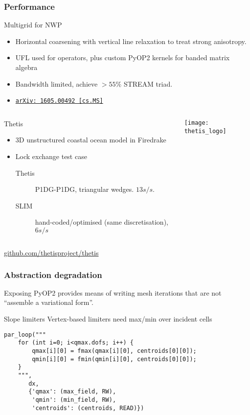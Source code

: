 \documentclass[presentation]{beamer}
\newcommand{\arxivlink}[2]{%
  \href{http://www.arxiv.org/abs/#1}%
  {{\small\texttt{arXiv:\,#1\,[#2]}}}%
}
\begin{document}
\begin{frame}[allowframebreaks]
  \frametitle{Performance}

  \begin{block}{Multigrid for NWP}
    \begin{itemize}
    \item Horizontal coarsening with vertical line relaxation to treat
      strong anisotropy.
    \item UFL used for operators, plus custom PyOP2 kernels for banded
      matrix algebra
    \item Bandwidth limited, achieve $> 55\%$ STREAM triad.
    \item \cite{Mitchell:2016} \arxivlink{1605.00492}{cs.MS}
    \end{itemize}
  \end{block}

\pagebreak

  \begin{columns}
    \begin{column}{0.7\textwidth}
      \begin{block}{Thetis}
        \begin{itemize}
        \item 3D unstructured coastal ocean model in Firedrake
        \item Lock exchange test case
          \begin{description}
          \item[Thetis] P1DG-P1DG, triangular wedges.  $13s/s$.
          \item[SLIM] hand-coded/optimised (same discretisation),
            $6s/s$
          \end{description}
        \end{itemize}
      \end{block}
    \end{column}
    \begin{column}[t]{0.3\textwidth}
      \texttt{[image: thetis\_logo]}
    \end{column}
  \end{columns}
  \begin{center}
    \url{github.com/thetisproject/thetis}    
  \end{center}
\end{frame}

\begin{frame}[fragile]
  \frametitle{Abstraction degradation}
  Exposing PyOP2 provides means of writing mesh iterations that are
  not ``assemble a variational form''.

  \begin{exampleblock}{Slope limiters}
    Vertex-based limiters need max/min over incident cells
\begin{verbatim}
par_loop("""
    for (int i=0; i<qmax.dofs; i++) {
        qmax[i][0] = fmax(qmax[i][0], centroids[0][0]);
        qmin[i][0] = fmin(qmin[i][0], centroids[0][0]);
    }
    """,
       dx,
       {'qmax': (max_field, RW),
        'qmin': (min_field, RW),
        'centroids': (centroids, READ)})
\end{verbatim}
  \end{exampleblock}
\end{frame}
\end{document}

